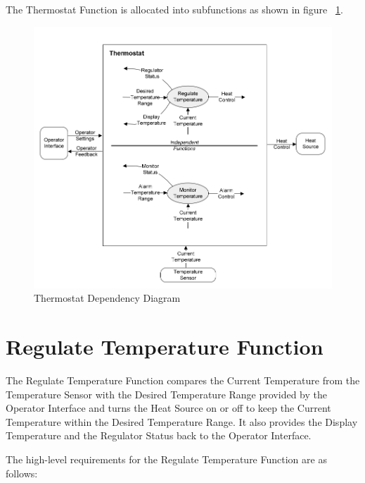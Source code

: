 The Thermostat Function is allocated into subfunctions as shown in figure ~\ref{fig:dependency}.

\begin{figure}[ht]
  \centerline{\includegraphics[width=\textwidth]{figures/thermostat-dependency-diagram.png}}
  \vspace{-.4cm}
  \caption{Thermostat Dependency Diagram}
  \vspace{-.4cm}
 \label{fig:dependency}
\end{figure}

\section{Regulate Temperature Function}
\label{sec:regulate-temperature-function}

The Regulate Temperature Function compares the Current Temperature from the Temperature
Sensor with the Desired Temperature Range provided by the Operator Interface and turns the
Heat Source on or off to keep the Current Temperature within the Desired Temperature Range.
It also provides the Display Temperature and the Regulator Status back to the Operator Interface.

The high-level requirements for the Regulate Temperature Function are as follows:


